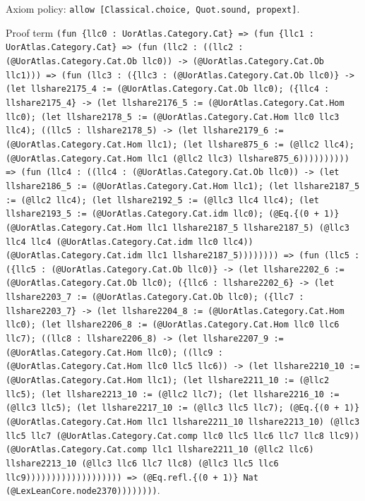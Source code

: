 \documentclass[11pt]{article}
\begin{document}
\noindent Axiom policy: \texttt{allow [Classical.choice, Quot.sound, propext]}.\par
\noindent Proof term \texttt{(fun \{llc0 : UorAtlas.Category.Cat\} => (fun \{llc1 : UorAtlas.Category.Cat\} => (fun (llc2 : ((llc2 : (@UorAtlas.Category.Cat.Ob llc0)) -> (@UorAtlas.Category.Cat.Ob llc1))) => (fun (llc3 : (\{llc3 : (@UorAtlas.Category.Cat.Ob llc0)\} -> (let llshare2175\_4 := (@UorAtlas.Category.Cat.Ob llc0); (\{llc4 : llshare2175\_4\} -> (let llshare2176\_5 := (@UorAtlas.Category.Cat.Hom llc0); (let llshare2178\_5 := (@UorAtlas.Category.Cat.Hom llc0 llc3 llc4); ((llc5 : llshare2178\_5) -> (let llshare2179\_6 := (@UorAtlas.Category.Cat.Hom llc1); (let llshare875\_6 := (@llc2 llc4); (@UorAtlas.Category.Cat.Hom llc1 (@llc2 llc3) llshare875\_6)))))))))) => (fun (llc4 : ((llc4 : (@UorAtlas.Category.Cat.Ob llc0)) -> (let llshare2186\_5 := (@UorAtlas.Category.Cat.Hom llc1); (let llshare2187\_5 := (@llc2 llc4); (let llshare2192\_5 := (@llc3 llc4 llc4); (let llshare2193\_5 := (@UorAtlas.Category.Cat.idm llc0); (@Eq.\{(0 + 1)\} (@UorAtlas.Category.Cat.Hom llc1 llshare2187\_5 llshare2187\_5) (@llc3 llc4 llc4 (@UorAtlas.Category.Cat.idm llc0 llc4)) (@UorAtlas.Category.Cat.idm llc1 llshare2187\_5)))))))) => (fun (llc5 : (\{llc5 : (@UorAtlas.Category.Cat.Ob llc0)\} -> (let llshare2202\_6 := (@UorAtlas.Category.Cat.Ob llc0); (\{llc6 : llshare2202\_6\} -> (let llshare2203\_7 := (@UorAtlas.Category.Cat.Ob llc0); (\{llc7 : llshare2203\_7\} -> (let llshare2204\_8 := (@UorAtlas.Category.Cat.Hom llc0); (let llshare2206\_8 := (@UorAtlas.Category.Cat.Hom llc0 llc6 llc7); ((llc8 : llshare2206\_8) -> (let llshare2207\_9 := (@UorAtlas.Category.Cat.Hom llc0); ((llc9 : (@UorAtlas.Category.Cat.Hom llc0 llc5 llc6)) -> (let llshare2210\_10 := (@UorAtlas.Category.Cat.Hom llc1); (let llshare2211\_10 := (@llc2 llc5); (let llshare2213\_10 := (@llc2 llc7); (let llshare2216\_10 := (@llc3 llc5); (let llshare2217\_10 := (@llc3 llc5 llc7); (@Eq.\{(0 + 1)\} (@UorAtlas.Category.Cat.Hom llc1 llshare2211\_10 llshare2213\_10) (@llc3 llc5 llc7 (@UorAtlas.Category.Cat.comp llc0 llc5 llc6 llc7 llc8 llc9)) (@UorAtlas.Category.Cat.comp llc1 llshare2211\_10 (@llc2 llc6) llshare2213\_10 (@llc3 llc6 llc7 llc8) (@llc3 llc5 llc6 llc9))))))))))))))))))) => (@Eq.refl.\{(0 + 1)\} Nat (@LexLeanCore.node2370))))))))}.\par
\end{document}
